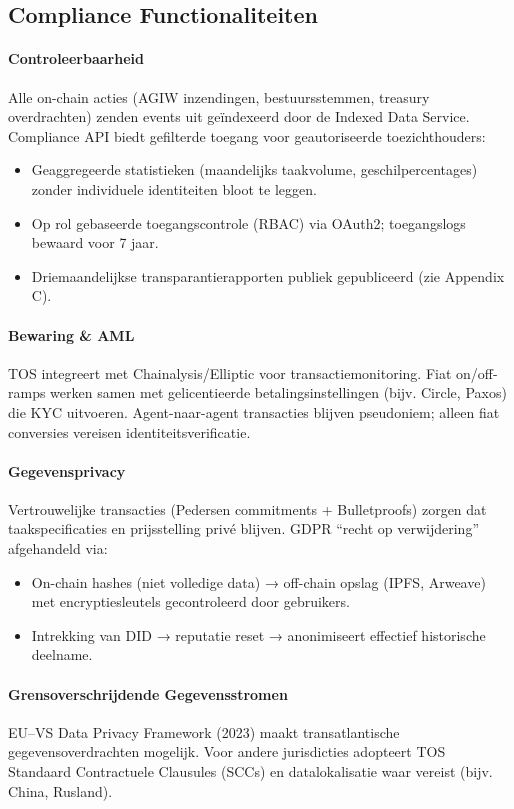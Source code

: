 \documentclass[11pt]{article}
\begin{document}
\subsection{Compliance Functionaliteiten}

\paragraph{Controleerbaarheid}
Alle on-chain acties (AGIW inzendingen, bestuursstemmen, treasury overdrachten) zenden events uit geïndexeerd door de Indexed Data Service. Compliance API biedt gefilterde toegang voor geautoriseerde toezichthouders:
\begin{itemize}[noitemsep]
  \item Geaggregeerde statistieken (maandelijks taakvolume, geschilpercentages) zonder individuele identiteiten bloot te leggen.
  \item Op rol gebaseerde toegangscontrole (RBAC) via OAuth2; toegangslogs bewaard voor 7 jaar.
  \item Driemaandelijkse transparantierapporten publiek gepubliceerd (zie Appendix C).
\end{itemize}

\paragraph{Bewaring \& AML}
TOS integreert met Chainalysis/Elliptic voor transactiemonitoring. Fiat on/off-ramps werken samen met gelicentieerde betalingsinstellingen (bijv. Circle, Paxos) die KYC uitvoeren. Agent-naar-agent transacties blijven pseudoniem; alleen fiat conversies vereisen identiteitsverificatie.

\paragraph{Gegevensprivacy}
Vertrouwelijke transacties (Pedersen commitments + Bulletproofs) zorgen dat taakspecificaties en prijsstelling privé blijven. GDPR ``recht op verwijdering'' afgehandeld via:
\begin{itemize}[noitemsep]
  \item On-chain hashes (niet volledige data) → off-chain opslag (IPFS, Arweave) met encryptiesleutels gecontroleerd door gebruikers.
  \item Intrekking van DID → reputatie reset → anonimiseert effectief historische deelname.
\end{itemize}

\paragraph{Grensoverschrijdende Gegevensstromen}
EU--VS Data Privacy Framework (2023) maakt transatlantische gegevensoverdrachten mogelijk. Voor andere jurisdicties adopteert TOS Standaard Contractuele Clausules (SCCs) en datalokalisatie waar vereist (bijv. China, Rusland).
\end{document}
